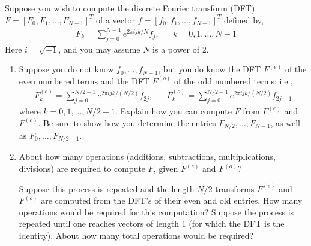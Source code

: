 \documentclass[10pt]{article}
\begin{document}
\begin{problem}
Suppose you wish to compute the discrete Fourier transform (DFT) \( F = [F_0,F_1, \ldots, F_{N-1}]^T \) of a vector \( f = [f_0,f_1, \ldots, f_{N-1}]^T \) defined by,
\begin{align*}
    F_k = \sum_{j=0}^{N-1} e^{2\pi i j k/N} f_j, && k=0,1,\ldots, N-1
\end{align*}
Here \( i = \sqrt{-1} \), and you may assume \( N \) is a power of \( 2 \).
\begin{enumerate}[nolistsep,label=(\alph*)]
    \item Suppose you do not know \( f_0, \ldots, f_{N-1} \), but you do know the DFT \( F^{(e)} \) of the even numbered terms and the DFT \( F^{(o)} \) of the odd numbered terms; i.e.,
        \begin{align*}
            F_k^{(e)} = \sum_{j=0}^{N/2-1}e^{2\pi i j k/(N/2)} f_{2j}, && F_k^{(o)} = \sum_{j=0}^{N/2-1}e^{2\pi i j k/(N/2)} f_{2j+1}
        \end{align*}
        where \( k=0,1,\ldots,N/2-1 \). Explain how you can compute \( F \) from \( F^{(e)} \) and \( F^{(o)} \). Be sure to show how you determine the entries \( F_{N/2}, \ldots, F_{N-1} \), as well as \( F_0, \ldots, F_{N/2-1} \).
    \item About how many operations (additions, subtractions, multiplications, divisions) are required to compute \( F \), given \( F^{(e)} \) and \( F^{(o)}\)?
        
        Suppose this process is repeated and the length \( N/2 \) transforms \( F^{(e)} \) and \( F^{(o)} \) are computed from the DFT’s of their even and old entries. How many operations would be required for this computation? Suppose the process is repeated until one reaches vectors
of length 1 (for which the DFT is the identity). About how many total operations would be required?
\end{enumerate}
\end{problem}
\end{document}

